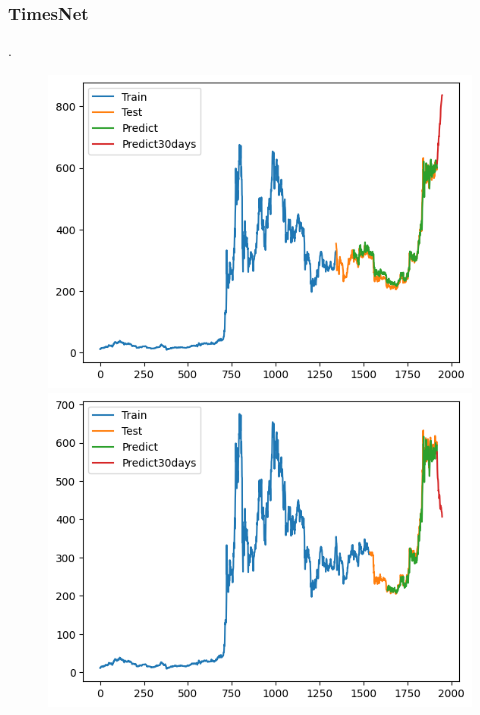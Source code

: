 \documentclass[conference]{IEEEtran}
\begin{document}
	\subsubsection{TimesNet}.
	\begin{figure}[H]
		\centering
		\begin{minipage}{0.15\textwidth}
			\centering
			\includegraphics[width=1\textwidth]{Figure/TimesNet_BNB_73.png}
		\end{minipage}
		\hfill
		\begin{minipage}{0.15\textwidth}
			\centering
			\includegraphics[width=1\textwidth]{Figure/TimesNet_BNB_82.png}
		\end{minipage}
		\hfill
		\begin{minipage}{0.15\textwidth}

\end{minipage}
\end{figure}
\end{document}
